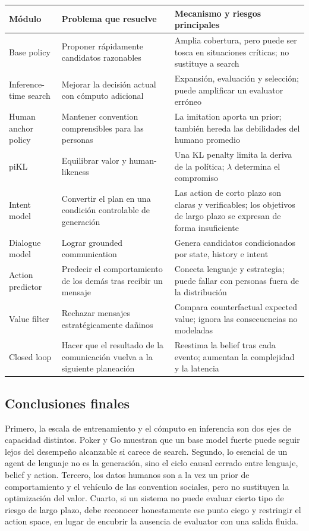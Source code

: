 \documentclass[a4paper]{article}
\begin{document}
\begin{longtable}{L{0.20\textwidth}L{0.30\textwidth}L{0.40\textwidth}}
\toprule
Módulo & Problema que resuelve & Mecanismo y riesgos principales \\
\midrule
Base policy & Proponer rápidamente candidatos razonables & Amplia cobertura, pero puede ser tosca en situaciones críticas; no sustituye a search \\
Inference-time search & Mejorar la decisión actual con cómputo adicional & Expansión, evaluación y selección; puede amplificar un evaluator erróneo \\
Human anchor policy & Mantener convention comprensibles para las personas & La imitation aporta un prior; también hereda las debilidades del humano promedio \\
piKL & Equilibrar valor y human-likeness & Una KL penalty limita la deriva de la política; $\lambda$ determina el compromiso \\
Intent model & Convertir el plan en una condición controlable de generación & Las action de corto plazo son claras y verificables; los objetivos de largo plazo se expresan de forma insuficiente \\
Dialogue model & Lograr grounded communication & Genera candidatos condicionados por state, history e intent \\
Action predictor & Predecir el comportamiento de los demás tras recibir un mensaje & Conecta lenguaje y estrategia; puede fallar con personas fuera de la distribución \\
Value filter & Rechazar mensajes estratégicamente dañinos & Compara counterfactual expected value; ignora las consecuencias no modeladas \\
Closed loop & Hacer que el resultado de la comunicación vuelva a la siguiente planeación & Reestima la belief tras cada evento; aumentan la complejidad y la latencia \\
\bottomrule
\end{longtable}

\subsection{Conclusiones finales}

Primero, la escala de entrenamiento y el cómputo en inferencia son dos ejes de capacidad distintos. Poker y Go muestran que un base model fuerte puede seguir lejos del desempeño alcanzable si carece de search. Segundo, lo esencial de un agent de lenguaje no es la generación, sino el ciclo causal cerrado entre lenguaje, belief y action. Tercero, los datos humanos son a la vez un prior de comportamiento y el vehículo de las convention sociales, pero no sustituyen la optimización del valor. Cuarto, si un sistema no puede evaluar cierto tipo de riesgo de largo plazo, debe reconocer honestamente ese punto ciego y restringir el action space, en lugar de encubrir la ausencia de evaluator con una salida fluida.
\end{document}

